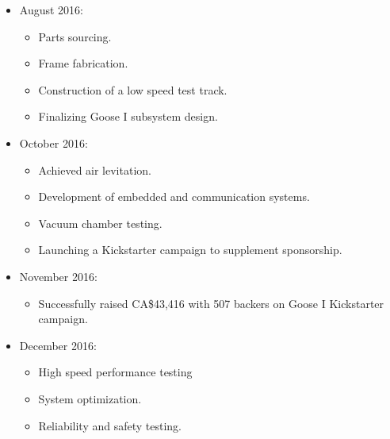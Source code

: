 \documentclass[11pt,a4paper,oldfontcommands]{memoir}
\begin{document}
\begin{itemize}
																		           \item August 2016:
																			       \begin{itemize}
																			               \item Parts sourcing.
																				               \item Frame fabrication.
																					               \item Construction of a low speed test track.
																						               \item Finalizing Goose I subsystem design.
																							           \end{itemize}

																								           \item October 2016:
																									       \begin{itemize}
																									               \item Achieved air levitation.
																										               \item Development of embedded and communication systems.
																											               \item Vacuum chamber testing.
																												               \item Launching a Kickstarter campaign to supplement sponsorship.
																													           \end{itemize}

																														           \item November 2016:
																															       \begin{itemize}
																															               \item Successfully raised CA\$43,416 with 507 backers on Goose I Kickstarter campaign.
																																           \end{itemize}

																																	           \item December 2016:
																																		       \begin{itemize}
																																		               \item High speed performance testing
																																			               \item System optimization.
																																				               \item Reliability and safety testing.
																																					           \end{itemize}


\end{itemize}
\end{document}
